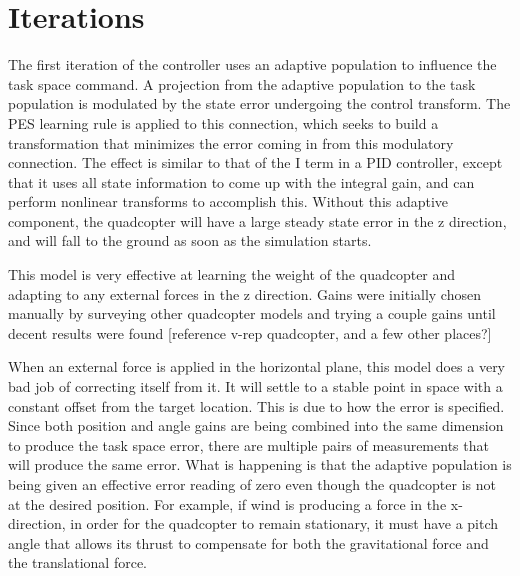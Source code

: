 \documentclass[letterpaper,12pt,titlepage,oneside,final]{book}
\begin{document}
\section{Iterations}


The first iteration of the controller uses an adaptive population to influence the task space command. 
A projection from the adaptive population to the task population is modulated by the state error undergoing the control transform. 
The PES learning rule is applied to this connection, which seeks to build a transformation that minimizes the error coming in from this modulatory connection. 
The effect is similar to that of the I term in a PID controller, except that it uses all state information to come up with the integral gain, and can perform nonlinear transforms to accomplish this. Without this adaptive component, the quadcopter will have a large steady state error in the z direction, and will fall to the ground as soon as the simulation starts.

This model is very effective at learning the weight of the quadcopter and adapting to any external forces in the z direction. 
Gains were initially chosen manually by surveying other quadcopter models and trying a couple gains until decent results were found [reference v-rep quadcopter, and a few other places?]

When an external force is applied in the horizontal plane, this model does a very bad job of correcting itself from it. 
It will settle to a stable point in space with a constant offset from the target location. This is due to how the error is specified. 
Since both position and angle gains are being combined into the same dimension to produce the task space error, there are multiple pairs of measurements that will produce the same error. 
What is happening is that the adaptive population is being given an effective error reading of zero even though the quadcopter is not at the desired position. 
For example, if wind is producing a force in the x-direction, in order for the quadcopter to remain stationary, it must have a pitch angle that allows its thrust to compensate for both the gravitational force and the translational force.
\end{document}
